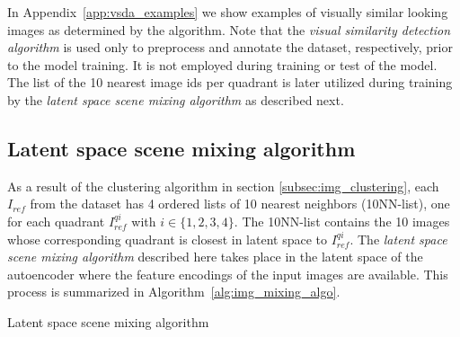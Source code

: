 \documentclass[12pt,a4paper]{article}
\begin{document}
In Appendix~\ref{app:vsda_examples} we show examples of visually similar looking images as determined by the algorithm. Note that the \textit{visual similarity detection algorithm} is used only to preprocess and annotate the dataset, respectively, prior to the model training. It is not employed during training or test of the model. The list of the 10 nearest image ids per quadrant is later utilized during training by the \textit{latent space scene mixing algorithm} as described next.


\subsection{Latent space scene mixing algorithm} \label{subsec:img_mixing_algo}
As a result of the clustering algorithm in section \ref{subsec:img_clustering}, each $I_{ref}$ from the dataset has 4 ordered lists of 10 nearest neighbors (10NN-list), one for each quadrant $I^{qi}_{ref}$ with $i \in \{1,2,3,4\}$. The 10NN-list contains the 10 images whose corresponding quadrant is closest in latent space to $I^{qi}_{ref}$. The \textit{latent space scene mixing algorithm} described here takes place in the latent space of the autoencoder where the feature encodings of the input images are available. This process is summarized in Algorithm~\ref{alg:img_mixing_algo}. 

\begin{algorithm}[H]
\DontPrintSemicolon
\LinesNumbered
{}
\caption{Latent space scene mixing algorithm}\label{alg:img_mixing_algo}
\end{algorithm}
\end{document}
